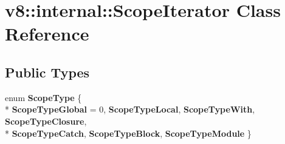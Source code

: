 \hypertarget{classv8_1_1internal_1_1_scope_iterator}{}\section{v8\+:\+:internal\+:\+:Scope\+Iterator Class Reference}
\label{classv8_1_1internal_1_1_scope_iterator}
\subsection*{Public Types}
\begin{DoxyCompactItemize}
\item 
\hypertarget{classv8_1_1internal_1_1_scope_iterator_aa4aa3e4d41cb6ce47ec9df9a056fc49b}{}enum {\bfseries Scope\+Type} \{ \\*
{\bfseries Scope\+Type\+Global} = 0, 
{\bfseries Scope\+Type\+Local}, 
{\bfseries Scope\+Type\+With}, 
{\bfseries Scope\+Type\+Closure}, 
\\*
{\bfseries Scope\+Type\+Catch}, 
{\bfseries Scope\+Type\+Block}, 
{\bfseries Scope\+Type\+Module}
 \}\label{classv8_1_1internal_1_1_scope_iterator_aa4aa3e4d41cb6ce47ec9df9a056fc49b}

\end{DoxyCompactItemize}

